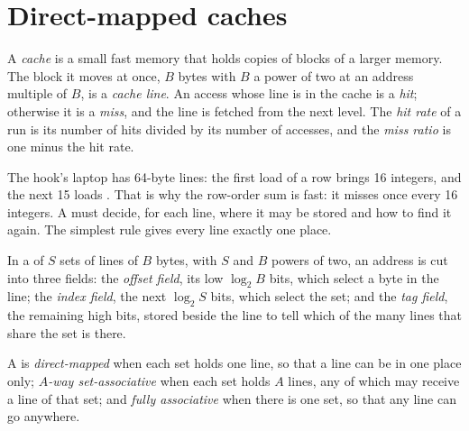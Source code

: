 \section{Direct-mapped caches}\label{sec:b2:caches:direct}

\begin{definition}\label{def:b2:caches:cache}
A \emph{cache} is a small fast memory that holds copies of blocks of a larger memory. The block it
moves at once, $B$ bytes with $B$ a power of two at an address multiple of $B$, is a \emph{cache line}. An access whose line is in the cache is a \emph{hit}; otherwise it is a \emph{miss},
and the line is fetched from the next level. The \emph{hit rate} of a run is its number of hits
divided by its number of accesses, and the \emph{miss ratio} is one minus the hit rate.
\end{definition}

The hook's laptop has 64-byte lines: the first load of a row brings 16 integers, and the next 15 loads . That is
why the row-order sum is fast: it misses once every 16 integers. A  must decide, for each line, where it may be
stored and how to find it again. The simplest rule gives every line exactly one place.

\begin{definition}\label{def:b2:caches:fields}
In a  of $S$ sets of lines of $B$ bytes, with $S$ and $B$ powers of two, an address is cut into three fields:
the \emph{offset field}, its low $\log_2 B$ bits, which select a byte in the line; the
\emph{index field}, the next $\log_2 S$ bits, which select the set; and the \emph{tag
field}, the remaining high bits, stored beside the line to tell which of the many lines that share
the set is there.
\end{definition}

\begin{definition}\label{def:b2:caches:mapping}
A  is \emph{direct-mapped} when each set holds one line, so that a line can be in
one place only; \emph{$A$-way set-associative} when each set holds $A$ lines, any of
which may receive a line of that set; and \emph{fully associative} when there is one
set, so that any line can go anywhere.
\end{definition}

